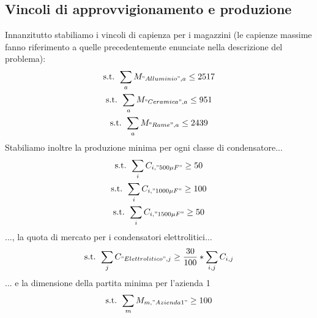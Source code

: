 \documentclass[11pt,a4paper]{article}
\begin{document}
\subsection{Vincoli di approvvigionamento e produzione}
Innanzitutto stabiliamo i vincoli di capienza per i magazzini (le capienze massime fanno riferimento a quelle precedentemente enunciate nella descrizione del problema): \\
\begin{gather*}
\text{s.t. } \sum_{a} M_{"Alluminio",a} \leq 2517\\
\text{s.t. } \sum_{a} M_{"Ceramica",a} \leq 951\\
\text{s.t. } \sum_{a} M_{"Rame",a} \leq 2439
\end{gather*}
Stabiliamo inoltre la produzione minima per ogni classe di condensatore... \\
\begin{gather*}
\text{s.t. } \sum_{i} C_{i,"500 \mu F"} \geq 50 \\
\text{s.t. } \sum_{i} C_{i,"1000 \mu F"} \geq 100 \\
\text{s.t. } \sum_{i} C_{i,"1500 \mu F"} \geq 50 \\
\end{gather*}
..., la quota di mercato per i condensatori elettrolitici... \\
\begin{equation}
\text{s.t. } \sum_{j} C_{"Elettrolitico",j} \geq \frac{30}{100}*\sum_{i,j} C_{i,j}
\end{equation}
... e la dimensione della partita minima per l'azienda 1
\begin{equation}
\text{s.t. } \sum_{m} M_{m,"Azienda 1"} \geq 100
\end{equation}
\end{document}
